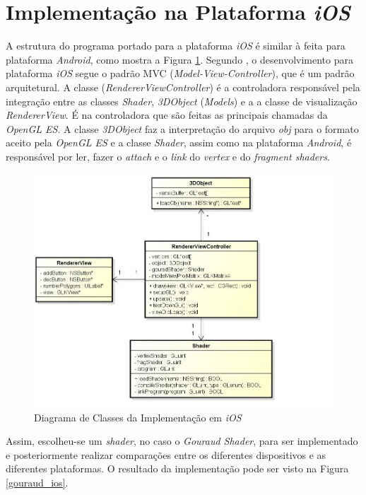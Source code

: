 \section{Implementação na Plataforma \textit{iOS}} 

	A estrutura do programa portado para a plataforma \textit{iOS} é similar à feita para plataforma \textit{Android}, como mostra a Figura \ref{ios_diag}. Segundo \cite{neub2013}, o desenvolvimento para plataforma \textit{iOS} segue o padrão MVC (\textit{Model-View-Controller}), que é um padrão arquitetural. A classe (\textit{RendererViewController}) é a controladora responsável pela integração entre as classes \textit{Shader}, \textit{3DObject} (\textit{Models}) e a a classe de visualização \textit{RendererView}. É na controladora que são feitas as principais chamadas da \textit{OpenGL ES}. A classe \textit{3DObject} faz a interpretação do arquivo \textit{obj} para o formato aceito pela \textit{OpenGL ES} e a classe \textit{Shader}, assim como na plataforma \textit{Android}, é responsável por ler, fazer o \textit{attach} e o \textit{link} do \textit{ vertex} e do \textit{fragment shaders}. 

	\begin{figure}[ht]
	\centering
		\includegraphics[keepaspectratio=true,scale=0.4]{figuras/ios_class_diagram.jpg}
	\caption{Diagrama de Classes da Implementação em \textit{iOS}}
	\label{ios_diag}
	\end{figure}

	Assim, escolheu-se um \textit{shader}, no caso o \textit{Gouraud Shader}, para ser implementado e posteriormente realizar comparações entre os diferentes dispositivos e as diferentes plataformas. O resultado da implementação pode ser visto na Figura \ref{gouraud_ios}.

